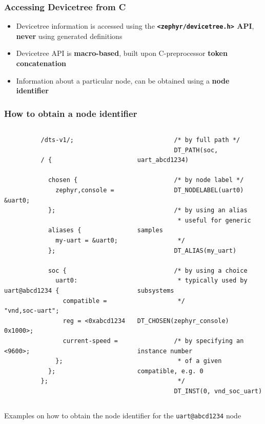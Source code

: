 \documentclass[handout]{beamer}
\begin{document}
\begin{frame}
  \frametitle{Accessing Devicetree from C}

  \begin{itemize}
    \item Devicetree information is accessed using the
          \textbf{\texttt{<zephyr/devicetree.h>} API}, \textbf{never} using
          generated definitions
    \item Devicetree API is \textbf{macro-based}, built upon C-preprocessor
          \textbf{token concatenation}
    \item Information about a particular node, can be obtained using a
          \textbf{node identifier}
  \end{itemize}
\end{frame}

\begin{frame}[fragile]
  \frametitle{How to obtain a node identifier}

  \begin{listing}[H]
    \begin{columns}
      \begin{column}{0.5\textwidth}
        \begin{verbatim}
          /dts-v1/;

          / {

            chosen {
              zephyr,console = &uart0;
            };

            aliases {
              my-uart = &uart0;
            };

            soc {
              uart0: uart@abcd1234 {
                compatible = "vnd,soc-uart";
                reg = <0xabcd1234 0x1000>;
                current-speed = <9600>;
              };
            };
          };
      \end{verbatim}
      \end{column}
      \begin{column}{0.5\textwidth}
        \begin{verbatim}
          /* by full path */
          DT_PATH(soc, uart_abcd1234)

          /* by node label */
          DT_NODELABEL(uart0)

          /* by using an alias
           * useful for generic samples
           */
          DT_ALIAS(my_uart)

          /* by using a choice
           * typically used by subsystems
           */
          DT_CHOSEN(zephyr_console)

          /* by specifying an instance number
           * of a given compatible, e.g. 0
           */
          DT_INST(0, vnd_soc_uart)
      \end{verbatim}
      \end{column}
    \end{columns}
    \caption{Examples on how to obtain the node identifier for the
      \texttt{uart@abcd1234} node}
  \end{listing}
\end{frame}
\end{document}
